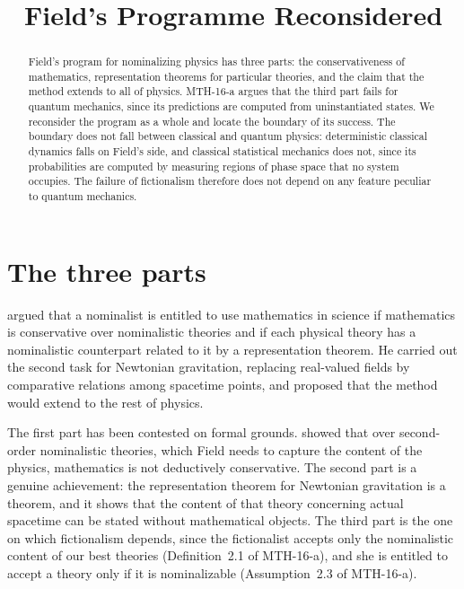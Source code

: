 \documentclass{situationist-preprint}
\title{Field's Programme Reconsidered}
\begin{document}
\maketitle

\begin{abstract}
Field's program for nominalizing physics has three parts: the conservativeness of mathematics, representation theorems for particular theories, and the claim that the method extends to all of physics. MTH-16-a argues that the third part fails for quantum mechanics, since its predictions are computed from uninstantiated states. We reconsider the program as a whole and locate the boundary of its success. The boundary does not fall between classical and quantum physics: deterministic classical dynamics falls on Field's side, and classical statistical mechanics does not, since its probabilities are computed by measuring regions of phase space that no system occupies. The failure of fictionalism therefore does not depend on any feature peculiar to quantum mechanics.
\end{abstract}

\section{The three parts}

\citet{Field1980} argued that a nominalist is entitled to use mathematics in science if mathematics is conservative over nominalistic theories and if each physical theory has a nominalistic counterpart related to it by a representation theorem. He carried out the second task for Newtonian gravitation, replacing real-valued fields by comparative relations among spacetime points, and proposed that the method would extend to the rest of physics.

The first part has been contested on formal grounds. \citet{Shapiro1983} showed that over second-order nominalistic theories, which Field needs to capture the content of the physics, mathematics is not deductively conservative. The second part is a genuine achievement: the representation theorem for Newtonian gravitation is a theorem, and it shows that the content of that theory concerning actual spacetime can be stated without mathematical objects. The third part is the one on which fictionalism depends, since the fictionalist accepts only the nominalistic content of our best theories (Definition~2.1 of MTH-16-a), and she is entitled to accept a theory only if it is nominalizable (Assumption~2.3 of MTH-16-a).
\end{document}
